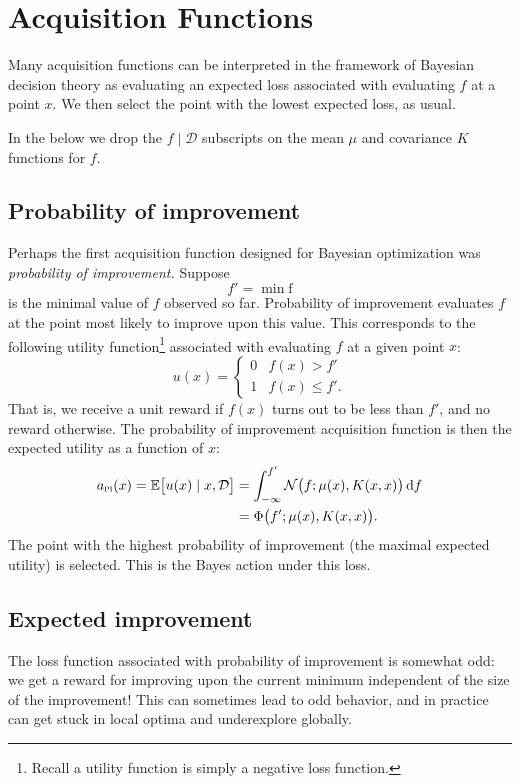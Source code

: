 \documentclass{article}
\newcommand{\acro}[1]{\textsc{\MakeLowercase{#1}}}
\newcommand{\given}{\mid}
\newcommand{\mc}[1]{\mathcal{#1}}
\newcommand{\data}{\mc{D}}
\newcommand{\intd}[1]{\,\mathrm{d}{#1}}
\renewcommand{\vec}[1]{\bm{\mathrm{#1}}}
\begin{document}
\section*{Acquisition Functions}

Many acquisition functions can be interpreted in the framework of
Bayesian decision theory as evaluating an expected loss associated
with evaluating $f$ at a point $x$.  We then select the point with the
lowest expected loss, as usual.

In the below we drop the $f \given \data$ subscripts on the mean $\mu$
and covariance $K$ functions for $f$.

\subsection*{Probability of improvement}

Perhaps the first acquisition function designed for Bayesian
optimization was \emph{probability of improvement.}  Suppose
\[
  f' = \min \vec{f}
\]
is the minimal value of $f$ observed so far.  Probability of
improvement evaluates $f$ at the point most likely to improve upon
this value.  This corresponds to the following utility
function\footnote{Recall a utility function is simply a negative loss
  function.} associated with evaluating $f$ at a given point $x$:
\[
  u(x)
  =
  \begin{cases}
    0 & f(x) > f' \\
    1 & f(x) \leq f'.
  \end{cases}
\]
That is, we receive a unit reward if $f(x)$ turns out to be less than
$f'$, and no reward otherwise.  The probability of improvement
acquisition function is then the expected utility as a function of
$x$:
\begin{align*}
  a_{\text{\acro{PI}}}(x)
  =
  \mathbb{E}\bigl[ u(x) \given x, \data \bigr]
  &=
  \int_{-\infty}^{f'}
  \mc{N}\bigl(f; \mu(x), K(x, x)\bigr)
  \intd{f}
  \\
  &=
  \Phi\bigl(f'; \mu(x), K(x, x)\bigr).
\end{align*}
The point with the highest probability of improvement (the maximal
expected utility) is selected.  This is the Bayes action under this
loss.

\subsection*{Expected improvement}

The loss function associated with probability of improvement is
somewhat odd: we get a reward for improving upon the current minimum
independent of the size of the improvement!  This can sometimes lead
to odd behavior, and in practice can get stuck in local optima and
underexplore globally.
\end{document}

